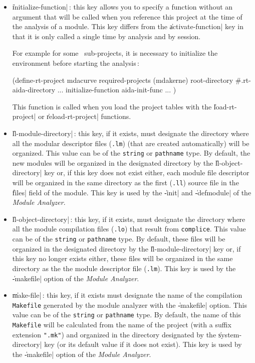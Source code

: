 \begin{itemize}
\item {\Large \|initialize-function|}\,: this key allows you to specify a function without an argument that will be called when you reference this project at the time of the analysis of a module.  This key differs from the \|activate-function| key in that it is only called a single time by analysis and by session.

For example for some \Aida\ sub-projects, it is necessary to
initialize the environment before starting the analysis\,:

\begin{Code*}
(define-rt-project mdacurve
  required-projects (mdakerne)
  root-directory #.rt-aida-directory
  ...
  initialize-function aida-init-func
  ...
  )
\end{Code*}

This function is called when you load the project tables with the 
\|load-rt-project| or \|reload-rt-project| functions.

\item {\Large \|ll-module-directory|}\,: this key, if it exists, must designate the directory where all the modular descriptor files ({\tt .lm}) (that are created automatically) will be organized.
This value can be of the {\tt string} or {\tt pathname} type.  By default, the new modules will be organized in the designated directory by the \|ll-object-directory| key or, if this key does not exist either, each module file descriptor will be organized in the same directory as the first ({\tt .ll}) source file in the \|files| field of the module.
This key is used by the \|-init| and \|-defmodule| of the {\em Module Analyzer}.

\item {\Large \|ll-object-directory|}\,: this key, if it exists,
must designate the directory where all the module compilation files ({\tt .lo}) that result from {\tt complice}.
This value can be of the {\tt string} or {\tt pathname} type. By default, these files will be organized in the designated directory by the \|ll-module-directory| key or, if this key no longer exists either, these files will be organized in the same directory as the 
the module descriptor file ({\tt .lm}).  This key is used by the \|-makefile| option of the {\em Module Analyzer}.

\item {\Large \|make-file|}\,: this key, if it exists
must designate the name of the compilation {\tt Makefile} generated by the module analyzer with the \|-makefile| option.  This
value can be of the {\tt string} or {\tt pathname} type.  By default, the name of this {\tt Makefile} will be calculated from the name of the project (with a suffix extension {\tt ".mk"}) and organized in the directory designated by the \|system-directory| key (or its default value if it does not exist).  This key is used by the \|-makefile| option of the {\em Module Analyzer}.


\end{itemize}
